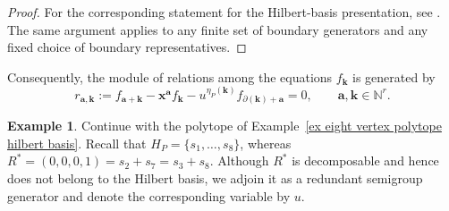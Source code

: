 \documentclass[11pt]{amsart}
\numberwithin{equation}{section}
\theoremstyle{plain}
\theoremstyle{definition}
\newtheorem{example}[theorem]{Example}
\newcommand{\0}{$0$-mutable}
\newcommand{\NN}{\ensuremath{\mathbb{N}}}
\newcommand{\bfa}{\ensuremath{\mathbf{a}}}
\newcommand{\bfk}{\ensuremath{\mathbf{k}}}
\newcommand{\bfx}{\ensuremath{\mathbf{x}}}
\renewcommand{\1}{$1$-rigid}
\renewcommand{\0}{$0$-mutable}
\begin{document}
\begin{proof}
For the corresponding statement for the Hilbert-basis presentation, see
\cite[Lemmas~5.3 and~5.6]{ACF22a}. The same argument applies to any
finite set of boundary generators and any fixed choice of boundary
representatives.
\end{proof}

Consequently, the module of relations among the equations \(f_{\bfk}\)
is generated by
\begin{equation}
\label{eq standard relation two summands}
r_{\bfa,\bfk}
:=
f_{\bfa+\bfk}
-
\bfx^{\bfa}f_{\bfk}
-
u^{\eta_P(\bfk)}
f_{\partial(\bfk)+\bfa}
=
0,
\qquad
\bfa,\bfk\in\NN^r.
\end{equation}

{
\begin{example}\label{ex eight vertex polytope coordinate ring}
Continue with the polytope of
Example~\ref{ex eight vertex polytope hilbert basis}. Recall that
\(H_P=\{s_1,\ldots,s_8\}\), whereas
\(R^*=(0,0,0,1)=s_2+s_7=s_3+s_8\). Although \(R^*\) is decomposable
and hence does not belong to the Hilbert basis, we adjoin it as a
redundant semigroup generator and denote the corresponding variable
by \(u\).


\end{example}}
\end{document}

